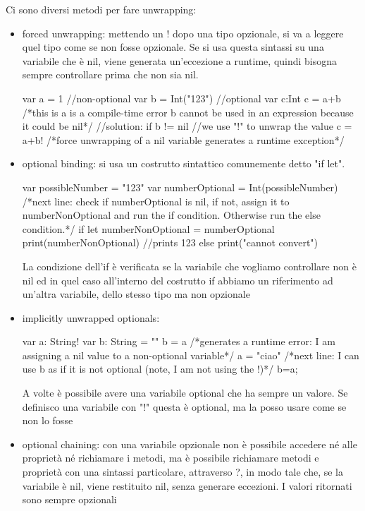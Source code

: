 Ci sono diversi metodi per fare unwrapping:
\begin{itemize}
    \item forced unwrapping: mettendo un ! dopo una tipo opzionale, si va a leggere quel tipo come se non fosse opzionale. Se si usa questa sintassi su una variabile che è nil, viene generata un'eccezione a runtime, quindi bisogna sempre controllare prima che non sia nil.
    \begin{Swift}
        var a = 1 //non-optional
        var b = Int("123") //optional
        var c:Int 
        c = a+b /*this is a is a compile-time error b cannot 
        be used in an expression because it could be nil*/
        //solution:
        if b != nil {
         //we use "!" to unwrap the value
         c = a+b!
        }
        /*force unwrapping of a nil variable generates 
        a runtime exception*/
    \end{Swift}
    \item optional binding: si usa un costrutto sintattico comunemente detto "if let". 
    \begin{Swift}
        var possibleNumber = "123"
        var numberOptional = Int(possibleNumber)
        /*next line: check if numberOptional is nil, 
        if not, assign it to numberNonOptional and run 
        the if condition. Otherwise run the else 
        condition.*/
        if let numberNonOptional = numberOptional {
         print(numberNonOptional) //prints 123
        } else {
         print("cannot convert")
        } 
    \end{Swift}
    La condizione dell'if è verificata se la variabile che vogliamo controllare non è nil ed in quel caso all'interno del costrutto if abbiamo un riferimento ad un'altra variabile, dello stesso tipo ma non opzionale
    \item implicitly unwrapped optionals:
    \begin{Swift}
        var a: String!
        var b: String = ""
        b = a /*generates a runtime error: I am assigning a 
        nil value to a non-optional variable*/
        a = "ciao"
        /*next line: I can use b as if it is not 
        optional (note, I am not using the !)*/
        b=a;
    \end{Swift}
    A volte è possibile avere una variabile optional che ha sempre un valore. Se definisco una variabile con "!" questa è optional, ma la posso usare come se non lo fosse
    \item optional chaining: con una variabile opzionale non è possibile accedere né alle proprietà né richiamare i metodi, ma è possibile richiamare metodi e proprietà con una sintassi particolare, attraverso ?, in modo tale che, se la variabile è nil, viene restituito nil, senza generare eccezioni. I valori ritornati sono sempre opzionali

\end{itemize}
